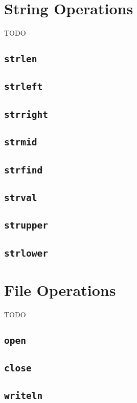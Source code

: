 \section{String Operations}

TODO

\subsection{\texttt{strlen}}
\subsection{\texttt{strleft}}
\subsection{\texttt{strright}}
\subsection{\texttt{strmid}}
\subsection{\texttt{strfind}}
\subsection{\texttt{strval}}
\subsection{\texttt{strupper}}
\subsection{\texttt{strlower}}


\section{File Operations}

TODO

\subsection{\texttt{open}}
\subsection{\texttt{close}}
\subsection{\texttt{writeln}}
